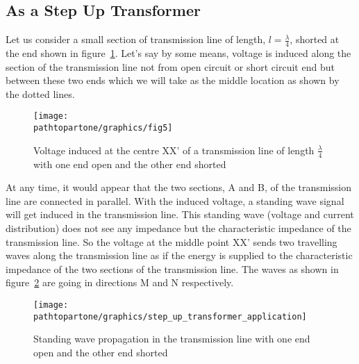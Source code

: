 \subsection{As a Step Up Transformer}
Let us consider a small section of transmission line of length, $l = \frac{\lambda}{4}$, shorted at the end shown in figure~\ref{fig:fig5}. Let's say by some means, voltage is induced along the section of the transmission line not from open circuit or short circuit end but between these two ends which we will take as the middle location as shown by the dotted lines.
\begin{figure}[h]
\centering
\texttt{[image: \\pathtopartone/graphics/fig5]}
\caption{Voltage induced at the centre XX' of a transmission line of length $\frac{\lambda}{4}$ with one end open and the other end shorted}
\label{fig:fig5}
\end{figure}

 At any time, it would appear that the two sections, A and B, of the transmission line are connected in parallel. With the induced voltage, a standing wave signal will get induced in the transmission line. This standing wave (voltage and current distribution) does not see any impedance but the characteristic impedance of the transmission line. So the voltage at the middle point XX' sends two travelling waves along the transmission line as if the energy is supplied to the characteristic impedance of the two sections of the transmission line. The waves as shown in figure~\ref{fig:fig6} are going in directions M and N respectively.
 \begin{figure}[h]
\centering
\texttt{[image: \\pathtopartone/graphics/step\_up\_transformer\_application]}
\caption{Standing wave propagation in the transmission line with one end open and the other end shorted}
\label{fig:fig6}
\end{figure}

